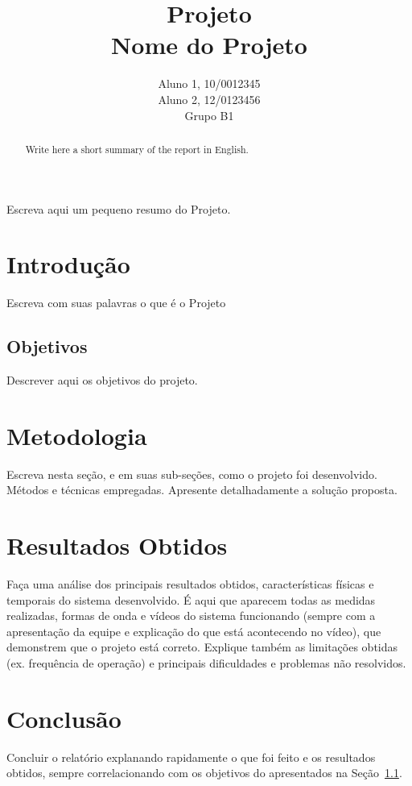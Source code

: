 \documentclass[12pt]{article}
\title{Projeto\\ 
Nome do Projeto}
\author{Aluno 1, 10/0012345\\
        Aluno 2,  12/0123456\\
        Grupo B1
}
\begin{document}
 
\maketitle

 \begin{abstract}
   Write here a short summary of the report in English.
 \end{abstract}
    
 \begin{resumo} 
  Escreva aqui um pequeno resumo do Projeto.
 \end{resumo}


\section{Introdução}
\label{sec:Introducao}

Escreva com suas palavras o que é o Projeto

\subsection{Objetivos}
\label{sec:Objetivos}

Descrever aqui os objetivos do projeto.

\section{Metodologia}
\label{sec:Metodologia}

Escreva nesta seção, e em suas sub-seções, como o projeto foi desenvolvido. Métodos e técnicas empregadas. 
Apresente detalhadamente a solução proposta.

\section{Resultados Obtidos}
\label{sec:Resultados}

Faça uma análise dos principais resultados obtidos, características físicas e temporais do sistema desenvolvido.
É aqui que aparecem todas as medidas realizadas, formas de onda e vídeos do sistema funcionando (sempre com a apresentação da equipe e explicação do que está acontecendo no vídeo), que demonstrem que o projeto está correto.
Explique também as limitações obtidas (ex. frequência de operação) e principais dificuldades e problemas não resolvidos.

\section{Conclusão}
\label{sec:Conclusao}

Concluir o relatório explanando rapidamente o que foi feito e os resultados obtidos, sempre correlacionando com os objetivos do apresentados na Seção~\ref{sec:Objetivos}. 



\end{document}
